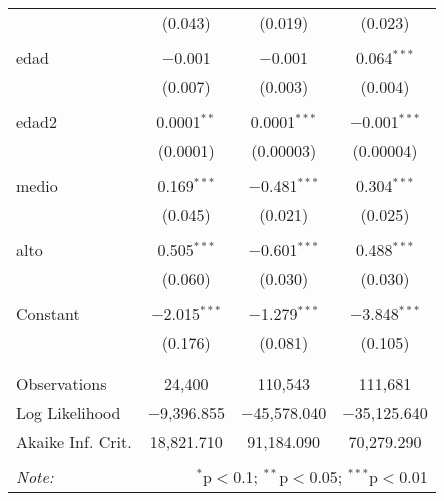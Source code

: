 \documentclass[10pt,a4paper]{book}
\begin{document}
\begin{table}[!htbp]
\begin{tabular}{@{\extracolsep{5pt}}lccc}
  & (0.043) & (0.019) & (0.023) \\ 
  & & & \\ 
 edad & $-$0.001 & $-$0.001 & 0.064$^{***}$ \\ 
  & (0.007) & (0.003) & (0.004) \\ 
  & & & \\ 
 edad2 & 0.0001$^{**}$ & 0.0001$^{***}$ & $-$0.001$^{***}$ \\ 
  & (0.0001) & (0.00003) & (0.00004) \\ 
  & & & \\ 
 medio & 0.169$^{***}$ & $-$0.481$^{***}$ & 0.304$^{***}$ \\ 
  & (0.045) & (0.021) & (0.025) \\ 
  & & & \\ 
 alto & 0.505$^{***}$ & $-$0.601$^{***}$ & 0.488$^{***}$ \\ 
  & (0.060) & (0.030) & (0.030) \\ 
  & & & \\ 
 Constant & $-$2.015$^{***}$ & $-$1.279$^{***}$ & $-$3.848$^{***}$ \\ 
  & (0.176) & (0.081) & (0.105) \\ 
  & & & \\ 
\hline \\[-1.8ex] 
Observations & 24,400 & 110,543 & 111,681 \\ 
Log Likelihood & $-$9,396.855 & $-$45,578.040 & $-$35,125.640 \\ 
Akaike Inf. Crit. & 18,821.710 & 91,184.090 & 70,279.290 \\ 
\hline 
\hline \\[-1.8ex] 
\textit{Note:}  & \multicolumn{3}{r}{$^{*}$p$<$0.1; $^{**}$p$<$0.05; $^{***}$p$<$0.01} \\ 
\end{tabular} 
\end{table} 
\end{document}
